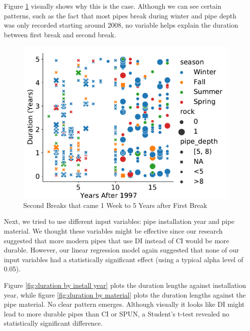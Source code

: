 \documentclass[twocolumn]{article}
\begin{document}
Figure \ref{fig:duration by year} visually shows why this is the case. Although we can see certain patterns, such as the fact that most pipes break during winter and pipe depth was only recorded starting around 2008, no variable helps explain the duration between first break and second break.

\begin{figure}[h!]
   \centering
    \includegraphics[scale = 0.5]{Bryan/model_fail.pdf}
    \caption{Second Breaks that came 1 Week to 5 Years after First Break}
    \label{fig:duration by year}
\end{figure}

Next, we tried to use different input variables: pipe installation year and pipe material. We thought these variables might be effective since our research suggested that more modern pipes that use DI instead of CI would be more durable. However, our linear regression model again suggested that none of our input variables had a statistically significant effect (using a typical alpha level of 0.05). 

Figure \ref{fig:duration by install year} plots the duration lengths against installation year, while figure \ref{fig:duration by material} plots the duration lengths against the pipe material. No clear pattern emerges. Although visually it looks like DI might lead to more durable pipes than CI or SPUN, a Student's t-test revealed no statistically significant difference. 
\end{document}
